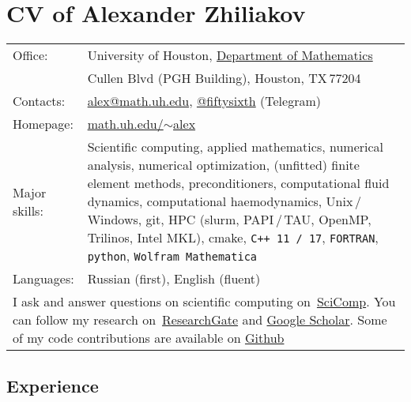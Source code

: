\documentclass[a4paper,12pt]{article}
\begin{document}
	\section*{CV of Alexander Zhiliakov}
	
	\begin{longtable}{ l >{\raggedright\arraybackslash}p{15cm} }
		Office:			& University of Houston, \href{http://www.uh.edu/nsm/math/}{Department of Mathematics}\\
		\phantom{Summer 2018} & 3551 Cullen Blvd (PGH Building), Houston, TX\,77204\vspace{1mm}\\
		Contacts:		& \href{mailto:alex@math.uh.edu}{alex@math.uh.edu}, \href{https://telegram.me/fiftysixth}{@fiftysixth} (Telegram)\vspace{1mm}\\
		Homepage:		& \href{https://www.math.uh.edu/~alex}{math.uh.edu/${\sim}$alex}\vspace{1mm}\\
		Major skills:	& Scientific computing, applied mathematics, numerical analysis, numerical optimization, (unfitted) finite element methods, preconditioners, computational fluid dynamics, computational haemodynamics, Unix\,/\,Windows, git, HPC (slurm, PAPI\,/\,TAU, OpenMP, Trilinos, Intel MKL), cmake, \texttt{C++\,11\,/\,17}, \texttt{FORTRAN}, \texttt{python}, \texttt{Wolfram Mathematica}\vspace{1mm}\\
		Languages:		& Russian (first), English (fluent)\vspace{3mm}\\
		\multicolumn{2}{p{17cm}}{I ask and answer questions on scientific computing on~\href{https://scicomp.stackexchange.com/users/21916/56th}{SciComp}. You can follow my research on~\href{https://www.researchgate.net/profile/Alexander_Zhiliakov}{ResearchGate} and \href{https://scholar.google.com/citations?user=wchxEFUAAAAJ}{Google Scholar}. Some of my code contributions are available on \href{https://github.com/56th}{Github}}\\
	\end{longtable} 
	
	\subsection*{Experience}
	
\end{document}
